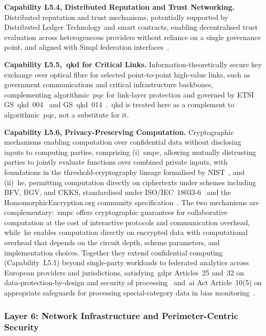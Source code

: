 \documentclass{ieeeaccess}
\begin{document}
\textbf{Capability L5.4, Distributed Reputation and Trust Networking.} Distributed reputation and trust mechanisms, potentially supported by Distributed Ledger Technology and smart contracts, enabling decentralised trust evaluation across heterogeneous providers without reliance on a single governance point, and aligned with Simpl federation interfaces~\cite{ecsimpl,oascmim5,etsingsild,eucsa}.

\textbf{Capability L5.5,~\acrfull{qkd} for Critical Links.} Information-theoretically secure key exchange over optical fibre for selected point-to-point high-value links, such as government communications and critical infrastructure backbones, complementing algorithmic~\gls{pqc} for link-layer protection and governed by ETSI GS~\gls{qkd}~004~\cite{etsiqkd004} and GS~\gls{qkd}~014~\cite{etsiqkd014}.~\gls{qkd} is treated here as a complement to algorithmic~\gls{pqc}, not a substitute for it.

\textbf{Capability L5.6, Privacy-Preserving Computation.} Cryptographic mechanisms enabling computation over confidential data without disclosing inputs to computing parties, comprising (i)~\gls{smpc}, allowing mutually distrusting parties to jointly evaluate functions over combined private inputs, with foundations in the threshold-cryptography lineage formalised by NIST~\cite{nistir8214}, and (ii)~\gls{he}, permitting computation directly on ciphertexts under schemes including BFV, BGV, and CKKS, standardised under ISO/IEC~18033-6~\cite{iso180336} and the HomomorphicEncryption.org community specification~\cite{he_standard2018}. The two mechanisms are complementary:~\gls{smpc} offers cryptographic guarantees for collaborative computation at the cost of interactive protocols and communication overhead, while~\gls{he} enables computation directly on encrypted data with computational overhead that depends on the circuit depth, scheme parameters, and implementation choices. Together they extend confidential computing (Capability~L5.1) beyond single-party workloads to federated analytics across European providers and jurisdictions, satisfying~\gls{gdpr} Articles~25 and~32 on data-protection-by-design and security of processing~\cite{eugdpr} and~\gls{ai} Act Article~10(5) on appropriate safeguards for processing special-category data in bias monitoring~\cite{euaiact}.

\subsubsection{Layer 6: Network Infrastructure and Perimeter-Centric Security}
\label{sec:L6}
\end{document}
